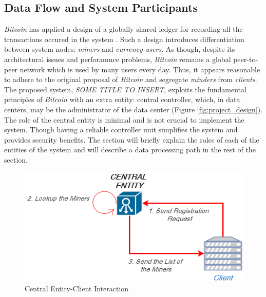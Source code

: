 \documentclass{article}
\newcommand{\projTitle}{SOME TITLE TO INSERT}
\begin{document}
\subsection{Data Flow and System Participants}
 \textit{Bitcoin} has applied a design of a globally shared ledger for recording all the transactions occured in the system \cite{bitcoin_paper}. Such a design introduces differentiation between system nodes: \textit{miners} and \textit{currency users}. As though, despite its architectural issues and perforamnce problems, \textit{Bitcoin} remains a global peer-to-peer network which is used by many users every day. Thus, it appears reasonable to adhere to the original proposal of \textit{Bitcoin} and segregate \textit{minders} from \textit{clients}. The proposed system, \textit{\projTitle}, exploits the fundamental principles of \textit{Bitcoin} with an extra entity: central controller, which, in data centers, may be the administrator of the data center (Figure \ref{fig:project_design}). The role of the central entity is minimal and is not crucial to implement the system. Though having a reliable controller unit simplifies the system and provides security benefits. The section will briefly explain the roles of each of the entities of the system and will describe a data processing path in the rest of the section.


\begin{figure}[h]
  \includegraphics[width=0.5\linewidth]{figures/central_entity_client_reg.png}
  \caption{Central Entity-Client Interaction}
  \label{fig:central_entity_client_reg}
\end{figure}
\end{document}
